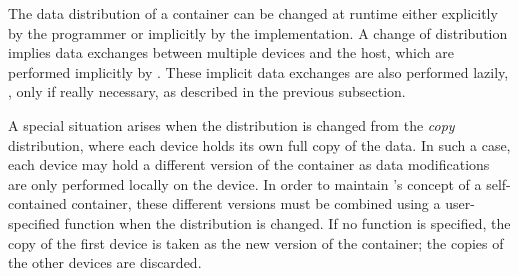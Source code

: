 The data distribution of a container can be changed at runtime either explicitly by the programmer or implicitly by the \SkelCL implementation.
A change of distribution implies data exchanges between multiple devices and the host, which are performed implicitly by \SkelCL.
These implicit data exchanges are also performed lazily, \ie, only if really necessary, as described in the previous subsection.

A special situation arises when the distribution is changed from the \emph{copy} distribution, where each device holds its own full copy of the data.
In such a case, each device may hold a different version of the container as data modifications are only performed locally on the device.
In order to maintain \SkelCL's concept of a self-contained container, these different versions must be combined using a user-specified function when the distribution is changed.
If no function is specified, the copy of the first device is taken as the new version of the container; the copies of the other devices are discarded.

